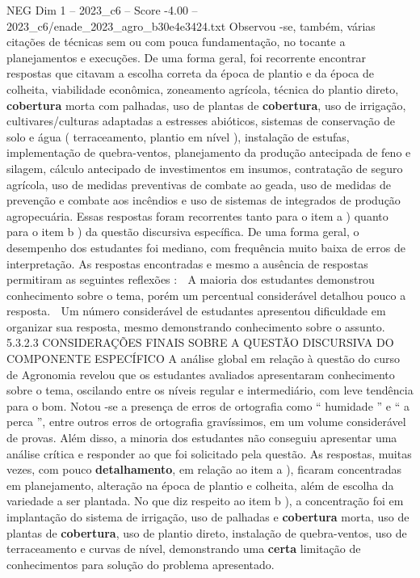 \begin{textsample}{NEG Dim 1 – 2023\_c6 – Score -4.00 – 2023\_c6/enade\_2023\_agro\_b30e4e3424.txt}
Observou -se, também, várias citações de técnicas sem ou com pouca fundamentação, no tocante a planejamentos e execuções.
De uma forma geral, foi recorrente encontrar respostas que citavam a escolha correta da época de plantio e da época de colheita, viabilidade econômica, zoneamento agrícola, técnica do plantio direto, \textbf{cobertura} morta com palhadas, uso de plantas de \textbf{cobertura}, uso de irrigação, cultivares/culturas adaptadas a estresses abióticos, sistemas de conservação de solo e água ( terraceamento, plantio em nível ), instalação de estufas, implementação de quebra-ventos, planejamento da produção antecipada de feno e silagem, cálculo antecipado de investimentos em insumos, contratação de seguro agrícola, uso de medidas preventivas de combate ao geada, uso de medidas de prevenção e combate aos incêndios e uso de sistemas de integrados de produção agropecuária.
Essas respostas foram recorrentes tanto para o item a ) quanto para o item b ) da questão discursiva específica.
De uma forma geral, o desempenho dos estudantes foi mediano, com frequência muito baixa de erros de interpretação.
As respostas encontradas e mesmo a ausência de respostas permitiram as seguintes reflexões :  A maioria dos estudantes demonstrou conhecimento sobre o tema, porém um percentual considerável detalhou pouco a resposta.  Um número considerável de estudantes apresentou dificuldade em organizar sua resposta, mesmo demonstrando conhecimento sobre o assunto. 5.3.2.3 CONSIDERAÇÕES FINAIS SOBRE A QUESTÃO DISCURSIVA DO COMPONENTE ESPECÍFICO A análise global em relação à questão do curso de Agronomia revelou que os estudantes avaliados apresentaram conhecimento sobre o tema, oscilando entre os níveis regular e intermediário, com leve tendência para o bom.
Notou -se a presença de erros de ortografia como “ humidade ” e “ a perca ”, entre outros erros de ortografia gravíssimos, em um volume considerável de provas.
Além disso, a minoria dos estudantes não conseguiu apresentar uma análise crítica e responder ao que foi solicitado pela questão.
As respostas, muitas vezes, com pouco \textbf{detalhamento}, em relação ao item a ), ficaram concentradas em planejamento, alteração na época de plantio e colheita, além de escolha da variedade a ser plantada.
No que diz respeito ao item b ), a concentração foi em implantação do sistema de irrigação, uso de palhadas e \textbf{cobertura} morta, uso de plantas de \textbf{cobertura}, uso de plantio direto, instalação de quebra-ventos, uso de terraceamento e curvas de nível, demonstrando uma \textbf{certa} limitação de conhecimentos para solução do problema apresentado.

\end{textsample}
